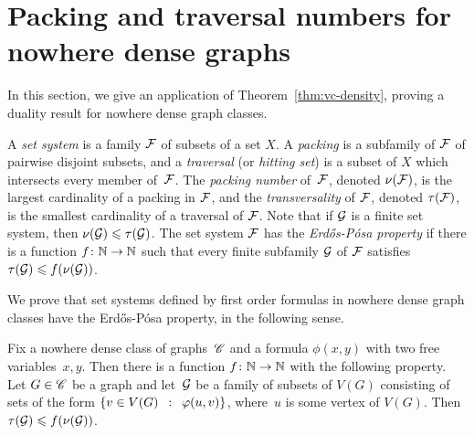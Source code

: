 \section{Packing and traversal numbers for nowhere dense graphs}\label{sec:ep}
In this section, we give an application of
Theorem~\ref{thm:vc-density}, proving a duality result for nowhere
dense graph classes.

A \emph{set system} is a family $\cal F$ of subsets of a set $X$.  A
\emph{packing} is a subfamily of $\cal F$ of pairwise disjoint
subsets, and a \emph{traversal} (or \emph{hitting set}) is a subset of
$X$ which intersects every member of~$\cal F$.  The \emph{packing
  number} of~$\cal F$, denoted $\nu(\cal F)$, is the largest
cardinality of a packing in $\cal F$, and the \emph{transversality} of
$\cal F$, denoted $\tau(\cal F)$, is the smallest cardinality of a
traversal of $\cal F$.  Note that if $\cal G$ is a finite set system,
then $\nu({\cal G})\le \tau(\cal G)$.  The set system $\cal F$ has the
\emph{Erd{\H o}s-P\'{o}sa property} if there is a function
$f\from\N\to\N$ such that every finite subfamily $\cal G$ of $\cal F$
satisfies $\tau({\cal G})\le f(\nu(\cal G))$.

We prove that set systems defined by first order formulas in nowhere
dense graph classes have the Erd{\H o}s-P\'{o}sa property, in the
following sense.

\setcounter{aux}{\value{theorem}} \setcounter{theorem}{\value{ep}}
\setcounter{auxsec}{\value{section}} \setcounter{section}{1}
\begin{theorem}
  Fix a nowhere dense class of graphs\, $\CCC$ and a formula
  $\phi(x,y)$ with two free variables~$x,y$.  Then there is a function
  $f\from \N\to\N$ with the following property.  Let $G\in \CCC$ be a
  graph and let\, $\cal G$ be a family of subsets of $V(G)$ consisting
  of sets of the form $\setof{v\in V(G)}{\phi(u, v)}$, where~$u$ is
  some vertex of $V(G)$.  Then~$\tau({\cal G})\le f(\nu(\cal G))$.
\end{theorem}
\setcounter{theorem}{\value{aux}} \setcounter{section}{\value{auxsec}}


